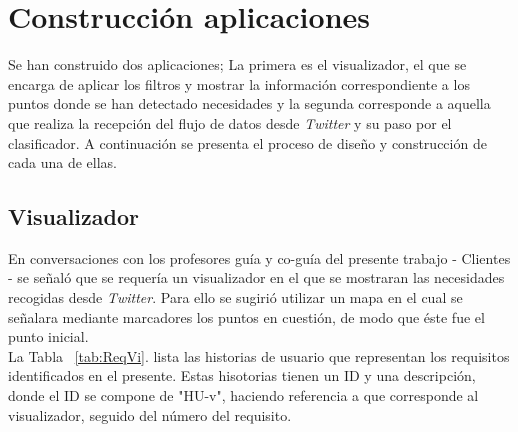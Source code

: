 \chapter{Construcción aplicaciones}
\label{cap:cuerpo}

Se han construido dos aplicaciones; La primera es el visualizador, el que se encarga de aplicar los filtros y mostrar la información correspondiente a los puntos donde se han detectado necesidades y la segunda corresponde a aquella que realiza la recepción del flujo de datos desde \textit{Twitter} y su paso por el clasificador. A continuación se presenta el proceso de diseño y construcción de cada una de ellas.

\section{Visualizador}
\label{sec:ReqVisualizador}

En conversaciones con los profesores guía y co-guía del presente trabajo - Clientes - se señaló que se requería un visualizador en el que se mostraran las necesidades recogidas desde \textit{Twitter}. Para ello se sugirió utilizar un mapa en el cual se señalara mediante marcadores los puntos en cuestión, de modo que éste fue el punto inicial.\\
La Tabla ~\ref{tab:ReqVi}. lista las historias de usuario que representan los requisitos identificados en el presente. Estas hisotorias tienen un ID y una descripción, donde el ID se compone de "HU-v", haciendo referencia a que corresponde al visualizador, seguido del número del requisito. 



